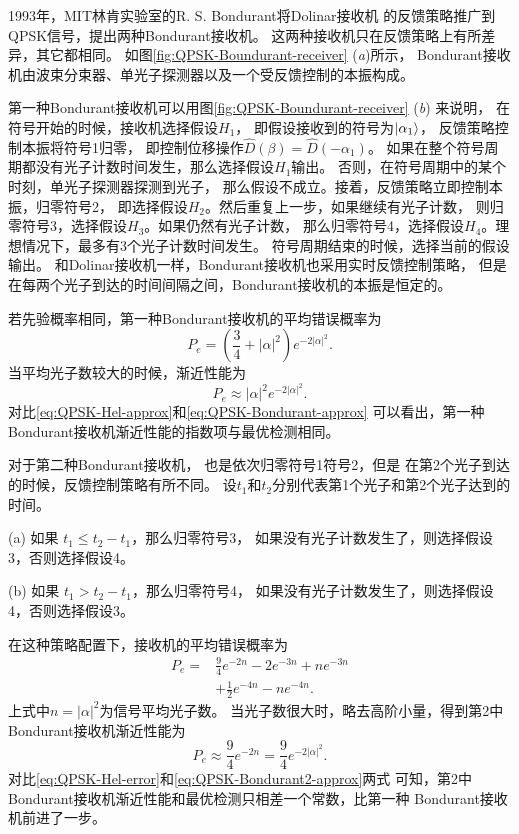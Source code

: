1993年，MIT林肯实验室的R. S. Bondurant将Dolinar接收机
的反馈策略推广到QPSK信号，提出两种Bondurant接收机。
这两种接收机只在反馈策略上有所差异，其它都相同\cite{bondurant1993near}。
如图\ref{fig:QPSK-Boundurant-receiver} (\textit{a})所示，
Bondurant接收机由波束分束器、单光子探测器以及一个受反馈控制的本振构成。

第一种Bondurant接收机可以用图\ref{fig:QPSK-Boundurant-receiver} (\textit{b}) 来说明，
在符号开始的时候，接收机选择假设$H_1$，
即假设接收到的符号为$\ket{\alpha_1}$，
反馈策略控制本振将符号1归零，
即控制位移操作$\hat{D}(\beta) = \hat{D}(-\alpha_1)$。
如果在整个符号周期都没有光子计数时间发生，那么选择假设$H_1$输出。
否则，在符号周期中的某个时刻，单光子探测器探测到光子，
那么假设不成立。接着，反馈策略立即控制本振，归零符号2，
即选择假设$H_2$。然后重复上一步，如果继续有光子计数，
则归零符号3，选择假设$H_3$。如果仍然有光子计数，
那么归零符号4，选择假设$H_4$。理想情况下，最多有3个光子计数时间发生。
符号周期结束的时候，选择当前的假设输出。
和Dolinar接收机一样，Bondurant接收机也采用实时反馈控制策略，
但是在每两个光子到达的时间间隔之间，Bondurant接收机的本振是恒定的。

若先验概率相同，第一种Bondurant接收机的平均错误概率为\cite{bondurant1993near}
\begin{equation}
P_e = (\frac{3}{4} + |\alpha|^2) e^{-2|\alpha|^2}.
\end{equation}
当平均光子数较大的时候，渐近性能为
\begin{equation}
P_e \approx |\alpha|^2 e^{-2|\alpha|^2}.
\label{eq:QPSK-Bondurant-approx}
\end{equation}
对比\ref{eq:QPSK-Hel-approx}和\ref{eq:QPSK-Bondurant-approx}
可以看出，第一种Bondurant接收机渐近性能的指数项与最优检测相同。

对于第二种Bondurant接收机，
也是依次归零符号1符号2，但是
在第2个光子到达的时候，反馈控制策略有所不同。
设$t_1$和$t_2$分别代表第1个光子和第2个光子达到的时间。

(a) 如果 $t_1 \le t_2 - t_1$，那么归零符号3，
如果没有光子计数发生了，则选择假设3，否则选择假设4。

(b) 如果 $t_1 > t_2 - t_1$，那么归零符号4，
如果没有光子计数发生了，则选择假设4，否则选择假设3。

在这种策略配置下，接收机的平均错误概率为\cite{bondurant1993near}
\begin{equation}
\begin{split}
P_e  =& \frac{9}{4} e^{-2n} - 2 e^{-3n} + n e^{-3n} \\
      &  + \frac{1}{2} e^{-4n} - n e^{-4n}. 
\end{split}
\end{equation}
上式中$n=|\alpha|^2$为信号平均光子数。
当光子数很大时，略去高阶小量，得到第2中Bondurant接收机渐近性能为
\begin{equation}
P_e \approx \frac{9}{4} e^{-2n} = \frac{9}{4} e^{-2|\alpha|^2}.
\label{eq:QPSK-Bondurant2-approx}
\end{equation}
对比\ref{eq:QPSK-Hel-error}和\ref{eq:QPSK-Bondurant2-approx}两式
可知，第2中Bondurant接收机渐近性能和最优检测只相差一个常数，比第一种
Bondurant接收机前进了一步。

